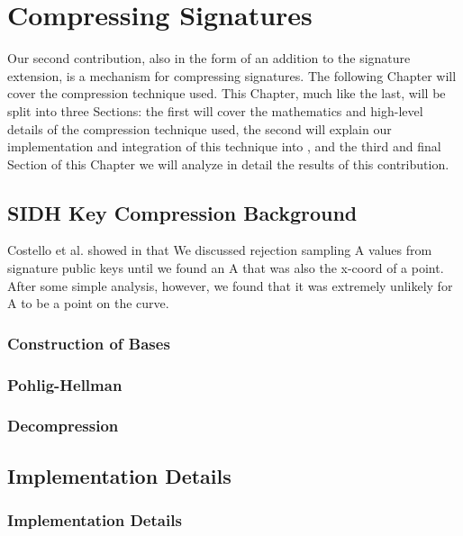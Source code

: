 \chapter{Compressing Signatures}
\label{sec:compress}

Our second contribution, also in the form of an addition to the \sidh signature extension, is a mechanism for compressing signatures. The following Chapter will cover the compression technique used. This Chapter, much like the last, will be split into three Sections: the first will cover the mathematics and high-level details of the compression technique used, the second will explain our implementation and integration of this technique into \sidh, and the third and final Section of this Chapter we will analyze in detail the results of this contribution.


\section{SIDH Key Compression Background}

Costello et al. showed in \cite{pkcomp} that  
We discussed rejection sampling A values from signature public keys until we found an A that was also the x-coord of a point. After some simple analysis, however, we found that it was extremely unlikely for A to be a point on the curve.

\subsection{Construction of Bases}

\subsection{Pohlig-Hellman}

\subsection{Decompression}

\section{Implementation Details}
\label{sec:compimplementation}

\subsection{Implementation Details}

